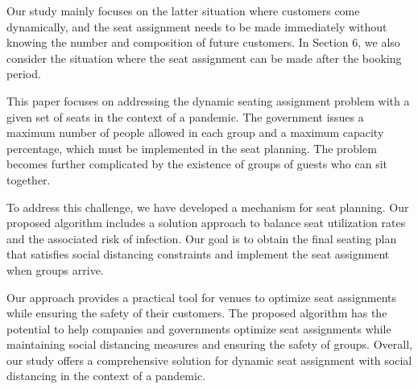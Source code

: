 Our study mainly focuses on the latter situation where customers come dynamically, and the seat assignment needs to be made immediately without knowing the number and composition of future customers. In Section 6, we also consider the situation where the seat assignment can be made after the booking period. 



This paper focuses on addressing the dynamic seating assignment problem with a given set of seats in the context of a pandemic. The government issues a maximum number of people allowed in each group and a maximum capacity percentage, which must be implemented in the seat planning. The problem becomes further complicated by the existence of groups of guests who can sit together.

To address this challenge, we have developed a mechanism for seat planning. Our proposed algorithm includes a solution approach to balance seat utilization rates and the associated risk of infection. Our goal is to obtain the final seating plan that satisfies social distancing constraints and implement the seat assignment when groups arrive.

Our approach provides a practical tool for venues to optimize seat assignments while ensuring the safety of their customers. The proposed algorithm has the potential to help companies and governments optimize seat assignments while maintaining social distancing measures and ensuring the safety of groups. Overall, our study offers a comprehensive solution for dynamic seat assignment with social distancing in the context of a pandemic.


